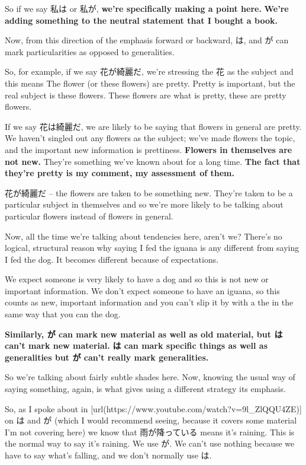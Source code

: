So if we say 私は or 私が, {\bf we're specifically making a point here.} {\bf We're adding something to the neutral statement that I bought a book.}

Now, from this direction of the emphasis forward or backward,\crlf
は, and が can mark particularities as opposed to generalities.

{}

So, for example, if we say 花が綺麗だ, we're stressing the 花 as the subject and this means The flower (or these flowers) are pretty. Pretty is important, but the real subject is these flowers. These flowers are what is pretty, these are pretty flowers.

If we say 花は綺麗だ, we are likely to be saying that flowers in general are pretty. We haven't singled out any flowers as the subject; we've made flowers the topic, and the important new information is prettiness. {\bf Flowers in themselves are not new.} They're something we've known about for a long time. {\bf The fact that they're pretty is my comment, my assessment of them.}

花が綺麗だ -- the flowers are taken to be something new. They're taken to be a particular subject in themselves and so we're more likely to be talking about particular flowers instead of flowers in general.

\thinrule

Now, all the time we're talking about tendencies here, aren't we? There's no logical, structural reason why saying I fed the iguana is any different from saying I fed the dog. It becomes different because of expectations.

We expect someone is very likely to have a dog and so this is not new or important information. We don't expect someone to have an iguana, so this counts as new, important information and you can't slip it by with a the in the same way that you can the dog.

{\bf Similarly, が can mark new material as well as old material,\crlf
but は can't mark new material.} {\bf は can mark specific things as well as generalities but が can't really mark generalities.}

So we're talking about fairly subtle shades here. Now, knowing the usual way of saying something, again, is what gives using a different strategy its emphasis.

So, as I spoke about in [url(https://www.youtube.com/watch?v=9l_ZlQQU4ZE)] on は and が (which I would recommend seeing, because it covers some material I'm not covering here) we know that 雨が降っている means it's raining. This is the normal way to say it's raining. We use が. We can't use nothing because we have to say what's falling, and we don't normally use は.

